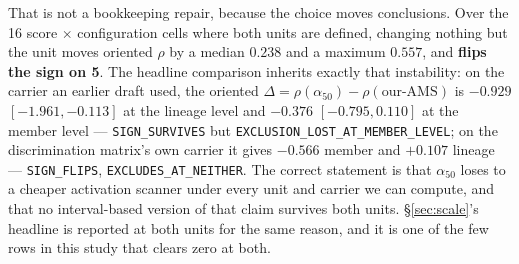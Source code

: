 \documentclass[11pt,letterpaper]{article}
\begin{document}
That is not a bookkeeping repair, because the choice moves conclusions. Over the 16 score $\times$ configuration cells where both units are defined, changing nothing but the unit moves oriented $\rho$ by a median $0.238$ and a maximum $0.557$, and \textbf{flips the sign on 5}. The headline comparison inherits exactly that instability: on the carrier an earlier draft used, the oriented $\Delta = \rho(\alpha_{50}) - \rho(\text{our-AMS})$ is $-0.929$ $[-1.961, -0.113]$ at the lineage level and $-0.376$ $[-0.795, 0.110]$ at the member level --- \texttt{SIGN\_SURVIVES} but \texttt{EXCLUSION\_LOST\_AT\_MEMBER\_LEVEL}; on the discrimination matrix's own carrier it gives $-0.566$ member and $+0.107$ lineage --- \texttt{SIGN\_FLIPS}, \texttt{EXCLUDES\_AT\_NEITHER}. The correct statement is that $\alpha_{50}$ loses to a cheaper activation scanner under every unit and carrier we can compute, and that no interval-based version of that claim survives both units. \S\ref{sec:scale}'s headline is reported at both units for the same reason, and it is one of the few rows in this study that clears zero at both.
\end{document}
